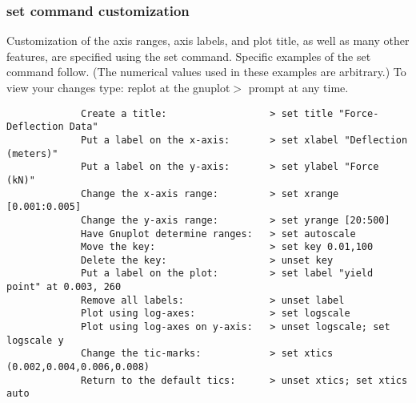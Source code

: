 	  \subsubsection{ set command customization}
	   Customization of the axis ranges, axis labels, and plot title, as well as many other features, are specified using the set command. Specific examples of the set command follow. (The numerical values used in these examples are arbitrary.) To view your changes type: replot at the gnuplot$>$ prompt at any time. 
	   \begin{verbatim}
	         Create a title:                  > set title "Force-Deflection Data" 
	         Put a label on the x-axis:       > set xlabel "Deflection (meters)"
	         Put a label on the y-axis:       > set ylabel "Force (kN)"
	         Change the x-axis range:         > set xrange [0.001:0.005]
	         Change the y-axis range:         > set yrange [20:500]
	         Have Gnuplot determine ranges:   > set autoscale
	         Move the key:                    > set key 0.01,100
	         Delete the key:                  > unset key
	         Put a label on the plot:         > set label "yield point" at 0.003, 260 
	         Remove all labels:               > unset label
	         Plot using log-axes:             > set logscale
	         Plot using log-axes on y-axis:   > unset logscale; set logscale y 
	         Change the tic-marks:            > set xtics (0.002,0.004,0.006,0.008)
	         Return to the default tics:      > unset xtics; set xtics auto
	         
	         
	   \end{verbatim}

